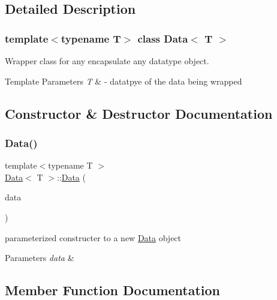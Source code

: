 \subsection{Detailed Description}
\subsubsection*{template$<$typename T$>$\newline
class Data$<$ T $>$}

Wrapper class for any encapsulate any datatype object. 


\begin{DoxyTemplParams}{Template Parameters}
{\em T} & -\/ datatpye of the data being wrapped \\
\hline
\end{DoxyTemplParams}


\subsection{Constructor \& Destructor Documentation}
\mbox{\label{classData_aeaaa183d93a880175aa4775525cd6165}} 
\subsubsection{\texorpdfstring{Data()}{Data()}}
{\footnotesize\ttfamily template$<$typename T $>$ \\
\hyperlink{classData}{Data}$<$ T $>$\+::\hyperlink{classData}{Data} (\begin{DoxyParamCaption}\item[{T}]{data }\end{DoxyParamCaption})\hspace{0.3cm}{\ttfamily [explicit]}}



parameterized constructer to a new \hyperlink{classData}{Data} object 


\begin{DoxyParams}{Parameters}
{\em data} & \\
\hline
\end{DoxyParams}


\subsection{Member Function Documentation}
\mbox{\label{classData_a1c956c4d07da4ff318f17811254ec7e5}} 
